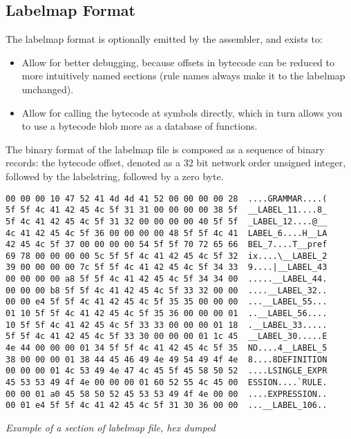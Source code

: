 \subsection{Labelmap Format}

The labelmap format is optionally emitted by the assembler, and exists to:

\begin{itemize}
\item Allow for better debugging, because offsets in bytecode can be reduced
      to more intuitively named sections (rule names always make it to
      the labelmap unchanged).
\item Allow for calling the bytecode at symbols directly, which in turn
      allows you to use a bytecode blob more as a database of functions.
\end{itemize}

The binary format of the labelmap file is composed as a sequence of
binary records: the bytecode offset, denoted as a 32 bit network order
unsigned integer, followed by the labelstring, followed by a zero byte.

\begin{myquote}
\begin{verbatim}
00 00 00 10 47 52 41 4d 4d 41 52 00 00 00 00 28  ....GRAMMAR....(
5f 5f 4c 41 42 45 4c 5f 31 31 00 00 00 00 38 5f  __LABEL_11....8_
5f 4c 41 42 45 4c 5f 31 32 00 00 00 00 40 5f 5f  _LABEL_12....@__
4c 41 42 45 4c 5f 36 00 00 00 00 48 5f 5f 4c 41  LABEL_6....H__LA
42 45 4c 5f 37 00 00 00 00 54 5f 5f 70 72 65 66  BEL_7....T__pref
69 78 00 00 00 00 5c 5f 5f 4c 41 42 45 4c 5f 32  ix....\__LABEL_2
39 00 00 00 00 7c 5f 5f 4c 41 42 45 4c 5f 34 33  9....|__LABEL_43
00 00 00 00 a8 5f 5f 4c 41 42 45 4c 5f 34 34 00  .....__LABEL_44.
00 00 00 b8 5f 5f 4c 41 42 45 4c 5f 33 32 00 00  ....__LABEL_32..
00 00 e4 5f 5f 4c 41 42 45 4c 5f 35 35 00 00 00  ...__LABEL_55...
01 10 5f 5f 4c 41 42 45 4c 5f 35 36 00 00 00 01  ..__LABEL_56....
10 5f 5f 4c 41 42 45 4c 5f 33 33 00 00 00 01 18  .__LABEL_33.....
5f 5f 4c 41 42 45 4c 5f 33 30 00 00 00 01 1c 45  __LABEL_30.....E
4e 44 00 00 00 01 34 5f 5f 4c 41 42 45 4c 5f 35  ND....4__LABEL_5
38 00 00 00 01 38 44 45 46 49 4e 49 54 49 4f 4e  8....8DEFINITION
00 00 00 01 4c 53 49 4e 47 4c 45 5f 45 58 50 52  ....LSINGLE_EXPR
45 53 53 49 4f 4e 00 00 00 01 60 52 55 4c 45 00  ESSION....`RULE.
00 00 01 a0 45 58 50 52 45 53 53 49 4f 4e 00 00  ....EXPRESSION..
00 01 e4 5f 5f 4c 41 42 45 4c 5f 31 30 36 00 00  ...__LABEL_106..

\end{verbatim}
\end{myquote}
\textit{Example of a section of labelmap file, hex dumped}


